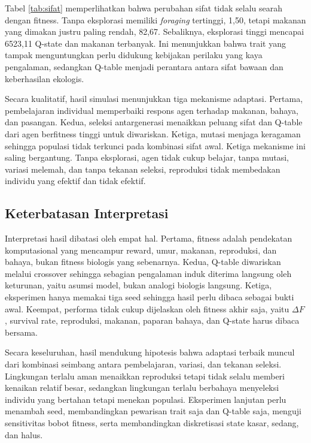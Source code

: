 \documentclass[10pt]{article}
\begin{document}
Tabel \ref{tab:sifat} memperlihatkan bahwa perubahan sifat tidak selalu searah dengan fitness. Tanpa eksplorasi memiliki \textit{foraging} tertinggi, 1,50, tetapi makanan yang dimakan justru paling rendah, 82,67. Sebaliknya, eksplorasi tinggi mencapai 6523,11 Q-state dan makanan terbanyak. Ini menunjukkan bahwa trait yang tampak menguntungkan perlu didukung kebijakan perilaku yang kaya pengalaman, sedangkan Q-table menjadi perantara antara sifat bawaan dan keberhasilan ekologis.

Secara kualitatif, hasil simulasi menunjukkan tiga mekanisme adaptasi. Pertama, pembelajaran individual memperbaiki respons agen terhadap makanan, bahaya, dan pasangan. Kedua, seleksi antargenerasi menaikkan peluang sifat dan Q-table dari agen berfitness tinggi untuk diwariskan. Ketiga, mutasi menjaga keragaman sehingga populasi tidak terkunci pada kombinasi sifat awal. Ketiga mekanisme ini saling bergantung. Tanpa eksplorasi, agen tidak cukup belajar, tanpa mutasi, variasi melemah, dan tanpa tekanan seleksi, reproduksi tidak membedakan individu yang efektif dan tidak efektif.

\subsection{Keterbatasan Interpretasi}
Interpretasi hasil dibatasi oleh empat hal. Pertama, fitness adalah pendekatan komputasional yang mencampur reward, umur, makanan, reproduksi, dan bahaya, bukan fitness biologis yang sebenarnya. Kedua, Q-table diwariskan melalui crossover sehingga sebagian pengalaman induk diterima langsung oleh keturunan, yaitu asumsi model, bukan analogi biologis langsung. Ketiga, eksperimen hanya memakai tiga seed sehingga hasil perlu dibaca sebagai bukti awal. Keempat, performa tidak cukup dijelaskan oleh fitness akhir saja, yaitu $\Delta F$, survival rate, reproduksi, makanan, paparan bahaya, dan Q-state harus dibaca bersama.

Secara keseluruhan, hasil mendukung hipotesis bahwa adaptasi terbaik muncul dari kombinasi seimbang antara pembelajaran, variasi, dan tekanan seleksi. Lingkungan terlalu aman menaikkan reproduksi tetapi tidak selalu memberi kenaikan relatif besar, sedangkan lingkungan terlalu berbahaya menyeleksi individu yang bertahan tetapi menekan populasi. Eksperimen lanjutan perlu menambah seed, membandingkan pewarisan trait saja dan Q-table saja, menguji sensitivitas bobot fitness, serta membandingkan diskretisasi state kasar, sedang, dan halus.
\end{document}
